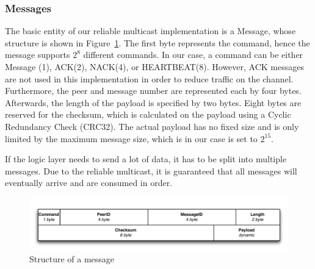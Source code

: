 \subsubsection{Messages}
The basic entity of our reliable multicast implementation is a Message, whose structure is shown in Figure~\ref{fig:messages}. The first byte represents the command, hence the message supports $2^8$ different commands. In our case, a command can be either Message (1), ACK(2), NACK(4), or HEARTBEAT(8). However, ACK messages are not used in this implementation in order to reduce traffic on the channel. Furthermore, the peer and message number are represented each by four bytes. Afterwards, the length of the payload is specified by two bytes. Eight bytes are reserved for the checksum, which is calculated on the payload using a Cyclic Redundancy Check (CRC32). The actual payload has no fixed size and is only limited by the maximum message size, which is in our case is set to $2^{15}$.

If the logic layer needs to send a lot of data, it has to be split into multiple messages. Due to the reliable multicast, it is guaranteed that all messages will eventually arrive and are consumed in order.

\begin{figure}[htbp]
    \centering
        \includegraphics[width=.9\textwidth]{figures/message.pdf}
    \caption{Structure of a message}
    \label{fig:messages}
\end{figure}

